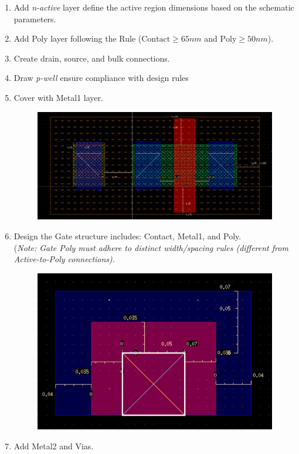 \begin{enumerate}[leftmargin=*, label = Step \arabic*:]
	\item Add \textit{n-active} layer define the active region dimensions based on the schematic parameters.
	\item Add Poly layer following the Rule ($\text{Contact} \geq 65nm$ and $\text{Poly} \geq 50nm$).
	\item  Create drain, source, and bulk connections.
	\item Draw \textit{p-well} ensure compliance with design rules
	\item Cover with Metal1 layer.
	\begin{figure}[H]
		\centering
		\includegraphics[width=.7\linewidth]{sections/pic/EX4_NMOS_metal.png}
		\label{f_EX4_NMOS_metal}
	\end{figure}
	\item Design the Gate structure includes: Contact, Metal1, and Poly.\\
	(\textit{Note: Gate Poly must adhere to distinct width/spacing rules (different from Active-to-Poly connections).}\\
	\begin{figure}[H]
		\centering
		\includegraphics[width=.7\linewidth]{sections/pic/EX4_NMOS_gate.png}
		\label{f_EX4_NMOS_gate}		
	\end{figure}
	\item Add Metal2 and Vias.

\end{enumerate}
